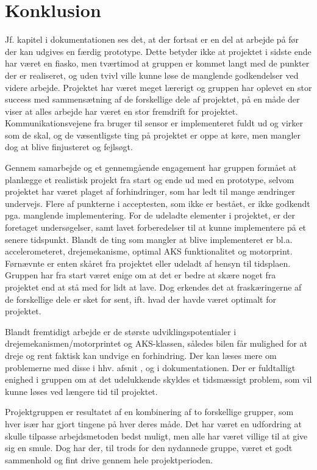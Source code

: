 \chapter{Konklusion}
\label{ch:Konklusion}

Jf. kapitel  i dokumentationen ses det, at der fortsat er en del at arbejde på før der kan udgives en færdig prototype. 
Dette betyder ikke at projektet i sidste ende har været en fiasko, men tværtimod at gruppen er kommet langt med de punkter der er realiseret, og uden tvivl ville kunne løse de manglende godkendelser ved videre arbejde. 
Projektet har været meget lærerigt og gruppen har oplevet en stor success med sammensætning af de forskellige dele af projektet, på en måde der viser at alles arbejde har været en stor fremdrift for projektet. 
Kommunikationsvejene fra bruger til sensor er implementeret fuldt ud og virker som de skal, og de væsentligste ting på projektet er oppe at køre, men mangler dog at blive finjusteret og fejlsøgt. 

Gennem samarbejde og et gennemgående engagement har gruppen formået at planlægge et realistisk projekt fra start og ende ud med en prototype, selvom projektet har været plaget af forhindringer, som har ledt til mange ændringer undervejs. 
Flere af punkterne i acceptesten, som ikke er bestået, er ikke godkendt pga. manglende implementering. 
For de udeladte elementer i projektet, er der foretaget undersøgelser, samt lavet forberedelser til at kunne implementere på et senere tidspunkt. 
Blandt de ting som mangler at blive implementeret er bl.a. accelerometeret, drejemekanisme, optimal AKS funktionalitet og motorprint. 
Førnævnte er enten skåret fra projektet eller udeladt af hensyn til tidsplaen. Gruppen har fra start været enige om at det er bedre at skære noget fra projektet end at stå med for lidt at lave. 
Dog erkendes det at fraskæringerne af de forskellige dele er sket for sent, ift. hvad der havde været optimalt for projektet.

Blandt fremtidigt arbejde er de største udviklingspotentialer i drejemekanismen/motorprintet og AKS-klassen, således bilen får mulighed for at dreje og rent faktisk kan undvige en forhindring. 
Der kan læses mere om problemerne med disse i hhv. afsnit ,  og  i dokumentationen. 
Der er fuldtalligt enighed i gruppen om at det udelukkende skyldes et tidsmæssigt problem, som vil kunne løses ved længere tid til projektet.

Projektgruppen er resultatet af en kombinering af to forskellige grupper, som hver især har gjort tingene på hver deres måde. Det har været en udfordring at skulle tilpasse arbejdsmetoden bedst muligt, men alle har været villige til at give sig en smule. Dog har der, til trods for den nydannede gruppe, været et godt sammenhold og fint drive gennem hele projektperioden.

